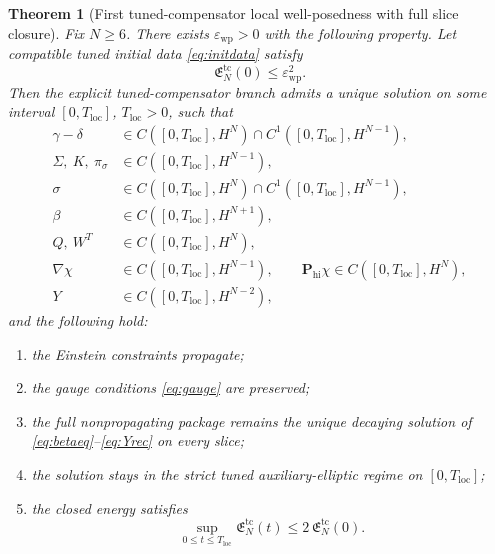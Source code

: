 \documentclass[11pt]{article}
\newtheorem{theorem}{Theorem}
\begin{document}
\begin{theorem}[First tuned-compensator local well-posedness with full slice closure]
\label{thm:local}
Fix \(N\ge 6\). There exists \(\varepsilon_{\mathrm{wp}}>0\) with the following property. Let compatible tuned initial data \eqref{eq:initdata} satisfy
\begin{equation}
\mathfrak E_N^{\mathrm{tc}}(0)\le \varepsilon_{\mathrm{wp}}^2.
\label{eq:wpsmall}
\end{equation}
Then the explicit tuned-compensator branch admits a unique solution on some interval \([0,T_{\mathrm{loc}}]\), \(T_{\mathrm{loc}}>0\), such that
\begin{align}
\gamma-\delta &\in C([0,T_{\mathrm{loc}}],H^N)\cap C^1([0,T_{\mathrm{loc}}],H^{N-1}),
\label{eq:reggamma}
\\
\Sigma,\ K,\ \pi_\sigma &\in C([0,T_{\mathrm{loc}}],H^{N-1}),
\label{eq:regsigmakpi}
\\
\sigma &\in C([0,T_{\mathrm{loc}}],H^N)\cap C^1([0,T_{\mathrm{loc}}],H^{N-1}),
\label{eq:regsigma}
\\
\beta &\in C([0,T_{\mathrm{loc}}],H^{N+1}),
\label{eq:regbeta}
\\
Q,\ W^T &\in C([0,T_{\mathrm{loc}}],H^N),
\label{eq:regaux}
\\
\nabla\chi &\in C([0,T_{\mathrm{loc}}],H^{N-1}),
\qquad
\mathbf P_{\mathrm{hi}}\chi\in C([0,T_{\mathrm{loc}}],H^N),
\label{eq:regchi}
\\
Y &\in C([0,T_{\mathrm{loc}}],H^{N-2}),
\label{eq:regY}
\end{align}
and the following hold:
\begin{enumerate}
    \item the Einstein constraints propagate;
    \item the gauge conditions \eqref{eq:gauge} are preserved;
    \item the full nonpropagating package remains the unique decaying solution of \eqref{eq:betaeq}--\eqref{eq:Yrec} on every slice;
    \item the solution stays in the strict tuned auxiliary-elliptic regime on \([0,T_{\mathrm{loc}}]\);
    \item the closed energy satisfies
    \begin{equation}
    \sup_{0\le t\le T_{\mathrm{loc}}}\mathfrak E_N^{\mathrm{tc}}(t)
    \le
    2\,\mathfrak E_N^{\mathrm{tc}}(0).
    \label{eq:localbound}
    \end{equation}
\end{enumerate}
\end{theorem}
\end{document}
